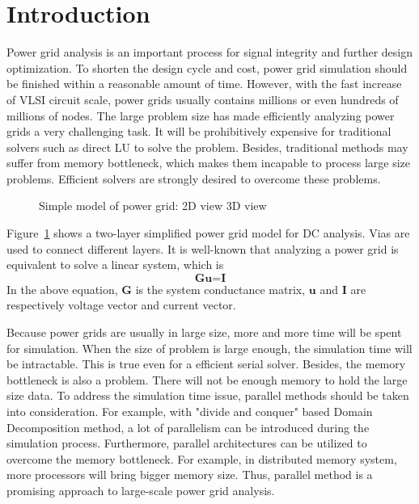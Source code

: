 \documentclass{sig-alternate}
\begin{document}
\section{Introduction}
Power grid analysis is an important process for signal integrity and further design 
optimization. To shorten the design cycle and cost, power grid simulation should be finished within a reasonable amount of time. 
However, with the fast increase of VLSI circuit scale, power grids usually contains millions or even hundreds of millions 
of nodes. The large problem size has made efficiently analyzing power grids a very challenging task. It will be prohibitively 
expensive for traditional solvers such as direct LU to solve the problem. Besides, traditional methods may suffer from memory 
bottleneck, which makes them incapable to process large size problems. Efficient solvers are strongly desired to overcome these problems.
	\begin{figure}[htbp]
	  \caption{Simple model of power grid: 
	   2D view
	   3D view}
	  \label{pg_model}
	\end{figure}
Figure~\ref{pg_model} shows a two-layer simplified power grid model for DC analysis. Vias are used to 
	connect different layers. It is well-known that analyzing a power grid is equivalent to solve a linear system, which is 
	\begin{equation}\label{eq1}
		\textbf{Gu=I}
	\end{equation}
In the above equation, {$\textbf{G}$} is the system conductance matrix, $\textbf{u}$ and $\textbf{I}$ are respectively voltage vector and current vector.

	Because power grids are usually in large size, more and more time will be
	spent for simulation. When the size of problem is large enough, the simulation time will be intractable. This is true even
	for a efficient serial solver.
	Besides, the memory bottleneck is also a problem. There will not be enough memory to hold the large size data. To address the
	simulation time issue, parallel methods should be taken into consideration. For example, with "divide and
	conquer" based Domain Decomposition method, a lot of parallelism can be introduced during the simulation process. Furthermore,
	parallel architectures can be utilized to overcome the memory bottleneck. For example, in distributed memory system, more 
	processors will bring bigger memory size. Thus, parallel method is a 
	promising approach to large-scale power grid analysis. 
\end{document}
